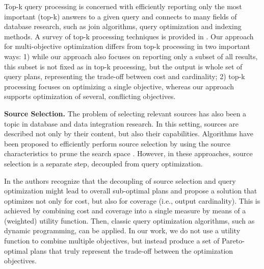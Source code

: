 Top-k query processing is concerned with efficiently reporting only
the most important (top-k) answers to a given query and connects to
many fields of database research, such as join algorithms, query
optimization and indexing methods. A survey of top-k processing
techniques is provided in \cite{ilyas_survey_2008}. Our approach for
multi-objective optimization differs from top-k processing in two
important ways: 1) while our approach also focuses on reporting only a
subset of all results, this subset is not fixed as in top-k
processing, but the output is whole set of query plans, representing
the trade-off between cost and cardinality; 2) top-k processing
focuses on optimizing a single objective, whereas our approach
supports optimization of several, conflicting objectives.


\textbf{Source Selection.} The problem of selecting relevant sources
has also been a topic in database and data integration research. In
this setting, sources are described not only by their content, but
also their capabilities. Algorithms have been proposed to efficiently
perform source selection by using the source characteristics to prune
the search space \cite{levy_querying_1996}. However, in these
approaches, source selection is a separate step, decoupled from query
optimization.

In \cite{nie_joint_2001} the authors recognize that the decoupling of
source selection and query optimization might lead to overall
sub-optimal plans and propose a solution that optimizes not only for
cost, but also for coverage (i.e., output cardinality). This is
achieved by combining cost and coverage into a single measure by means
of a (weighted) utility function. Then, classic query optimization
algorithms, such as dynamic programming, can be applied. In our work,
we do not use a utility function to combine multiple objectives, but
instead produce a set of Pareto-optimal plans that truly represent the
trade-off between the optimization objectives.




